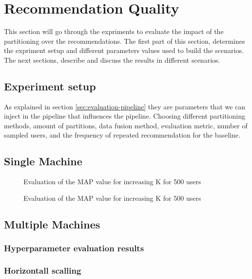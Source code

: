\section{Recommendation Quality}
\label{sec:recommendation-quality}
This section will go through the expriments to evaluate the impact of the partitioning over the recommendations. The first part of this section, determines the expriment setup and different parameters values used to build the scenarios. The next sections, describe and discuss the results in different scenarios.


\subsection{Experiment setup}
\label{subsec:experiment-setup}
As explained in section \ref{sec:evaluation-pipeline} they are parameters that we can inject in the pipeline that influences the pipeline. Choosing different partitioning methods, amount of partitions, data fusion method, evaluation metric, number of sampled users, and the frequency of repeated recommendation for the baseline.


\subsection{Single Machine}
\label{subsec:eval-single-machine}

\begin{figure}[h!]
    \centering
    
    \caption{Evaluation of the MAP value for increasing K for 500 users}
    \label{plot:single-partition}
\end{figure}

\begin{figure}[h!]
    \centering
    
    \caption{Evaluation of the MAP value for increasing K for 500 users}
    \label{plot:single-partition-boxplot}
\end{figure}

\subsection{Multiple Machines}
\label{subsec:eval-multiple-machines}

\subsubsection{Hyperparameter evaluation results}
\label{subsubsec:eval-hyperparameter}

\subsubsection{Horizontall scalling}
\label{subsubsec:eval-horizontall-scalling}

